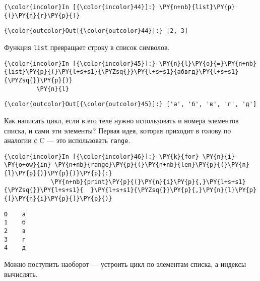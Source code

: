     \begin{Verbatim}[commandchars=\\\{\}]
{\color{incolor}In [{\color{incolor}44}]:} \PY{n+nb}{list}\PY{p}{(}\PY{n}{r}\PY{p}{)}
\end{Verbatim}

            \begin{Verbatim}[commandchars=\\\{\}]
{\color{outcolor}Out[{\color{outcolor}44}]:} [2, 3]
\end{Verbatim}
        
    Функция \texttt{list} превращает строку в список символов.

    \begin{Verbatim}[commandchars=\\\{\}]
{\color{incolor}In [{\color{incolor}45}]:} \PY{n}{l}\PY{o}{=}\PY{n+nb}{list}\PY{p}{(}\PY{l+s+s1}{\PYZsq{}}\PY{l+s+s1}{абвгд}\PY{l+s+s1}{\PYZsq{}}\PY{p}{)}
         \PY{n}{l}
\end{Verbatim}

            \begin{Verbatim}[commandchars=\\\{\}]
{\color{outcolor}Out[{\color{outcolor}45}]:} ['а', 'б', 'в', 'г', 'д']
\end{Verbatim}
        
    Как написать цикл, если в его теле нужно использовать и номера элементов
списка, и сами эти элементы? Первая идея, которая приходит в голову по
аналогии с C --- это использовать \texttt{range}.

    \begin{Verbatim}[commandchars=\\\{\}]
{\color{incolor}In [{\color{incolor}46}]:} \PY{k}{for} \PY{n}{i} \PY{o+ow}{in} \PY{n+nb}{range}\PY{p}{(}\PY{n+nb}{len}\PY{p}{(}\PY{n}{l}\PY{p}{)}\PY{p}{)}\PY{p}{:}
             \PY{n+nb}{print}\PY{p}{(}\PY{n}{i}\PY{p}{,}\PY{l+s+s1}{\PYZsq{}}\PY{l+s+s1}{  }\PY{l+s+s1}{\PYZsq{}}\PY{p}{,}\PY{n}{l}\PY{p}{[}\PY{n}{i}\PY{p}{]}\PY{p}{)}
\end{Verbatim}

    \begin{Verbatim}[commandchars=\\\{\}]
0    а
1    б
2    в
3    г
4    д

    \end{Verbatim}

    Можно поступить наоборот --- устроить цикл по элементам списка, а индексы
вычислять.

